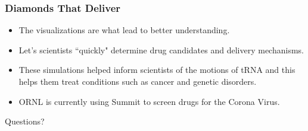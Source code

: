 \begin{frame}
\frametitle{Diamonds That Deliver}
    \begin{itemize}
        \item The visualizations are what lead to better understanding.
        \item Let's scientists ``quickly" determine drug candidates and delivery
        mechanisms.
        \item These simulations helped inform scientists of the motions of tRNA
        and this helps them treat conditions such as cancer and genetic
        disorders.
        \item ORNL is currently using Summit to screen drugs for the Corona
        Virus.
    \end{itemize}
\end{frame}

\begin{frame}
\center\Huge{Questions?}
\end{frame}
